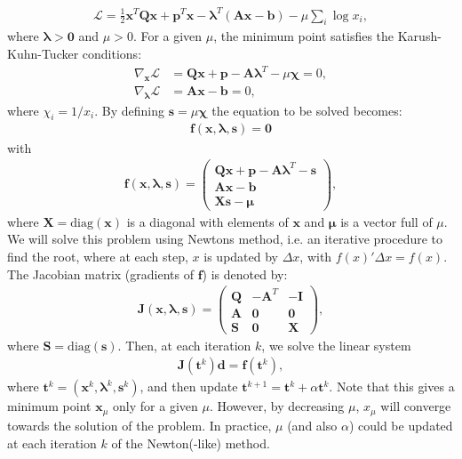 \documentclass[11pt, a4paper, parskip=half*, bibliography=totoc, cleardoublepage=empty, final,
numbers=noenddot]{scrbook}
\begin{document}
\begin{align}
\mathcal{L} = \frac{1}{2} \bm{x}^T \bm{Q} \bm{x} + \bm{p}^T \bm{x} - \bm{\lambda}^T (\bm{A} \bm{x} - \bm{b}) - \mu \sum_i \log{x_i},
\end{align}
where $\bm{\lambda} > \bm{0}$ and $\mu > 0$. For a given $\mu$, the minimum point satisfies the Karush-Kuhn-Tucker conditions:
\begin{align}
\nabla_{\bm{x}} \mathcal{L} &=  \bm{Q} \bm{x} + \bm{p} -  \bm{A} \bm{\lambda}^T -  \mu \bm{\chi} = 0,\\
\nabla_{\bm{\lambda}} \mathcal{L} &=  \bm{A} \bm{x} - \bm{b} = 0,
\end{align}
where $\chi_i = 1/x_i$. By defining $\bm{s} = \mu \bm{\chi}$ the equation to be solved becomes:
\begin{align}
\bm{f}(\bm{x}, \bm{\lambda}, \bm{s}) = \bm{0}
\end{align} 
with
\begin{align}
\bm{f}(\bm{x}, \bm{\lambda}, \bm{s}) = 
\begin{pmatrix}
\bm{Q} \bm{x} + \bm{p} -  \bm{A} \bm{\lambda}^T - \bm{s} \\
\bm{A} \bm{x} - \bm{b} \\
\bm{X} \bm{s} - \bm{\mu}
\end{pmatrix},
\end{align} 
where $\bm{X} = \text{diag}(\bm{x})$ is a diagonal with elements of $\bm{x}$ and $\bm{\mu}$ is a vector full of $\mu$. We will solve this problem using Newtons method, i.e. an iterative procedure to find the root, where at each step, $x$ is updated by $\Delta x$, with $f(x)' \Delta x= f(x)$. The Jacobian matrix (gradients of $\bm{f}$) is denoted by:
\begin{align}
\bm{J}(\bm{x}, \bm{\lambda}, \bm{s}) = 
\begin{pmatrix}
\bm{Q} &  -\bm{A}^T & - \bm{I} \\
\bm{A} & \bm{0} & \bm{0} \\
\bm{S} & \bm{0} & \bm{X}
\end{pmatrix},
\end{align}
where $\bm{S}=\text{diag}(\bm{s})$.
Then, at each iteration $k$, we solve the linear system
\begin{align}
\bm{J}(\bm{t}^k) \bm{d} = \bm{f}(\bm{t}^k),
\end{align}
where $\bm{t}^k = (\bm{x}^k, \bm{\lambda}^k, \bm{s}^k)$, and then update $\bm{t}^{k+1} = \bm{t}^{k} + \alpha \bm{t}^{k}$. Note that this gives a minimum point $\bm{x}_\mu$ only for a given $\mu$. However, by decreasing $\mu$, $x_\mu$ will converge towards the solution of the problem. In practice, $\mu$ (and also $\alpha$) could be updated at each iteration $k$ of the Newton(-like) method.
\end{document}
